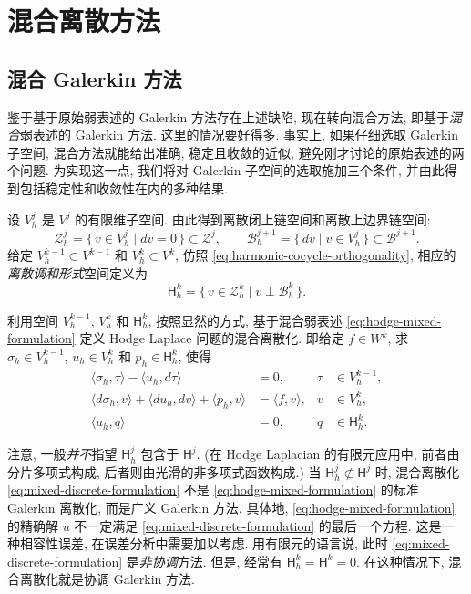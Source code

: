 \section{混合离散方法}\label{sec:mixed-methods}

\subsection{混合 Galerkin 方法}\label{subsec:mixed-galerkin}

鉴于基于原始弱表述的 Galerkin 方法存在上述缺陷, 现在转向混合方法, 即基于\emph{混合}弱表述的 Galerkin 方法. 这里的情况要好得多. 事实上, 如果仔细选取 Galerkin 子空间, 混合方法就能给出准确, 稳定且收敛的近似, 避免刚才讨论的原始表述的两个问题. 为实现这一点, 我们将对 Galerkin 子空间的选取施加三个条件, 并由此得到包括稳定性和收敛性在内的多种结果.

设 $V_h^j$ 是 $V^j$ 的有限维子空间. 由此得到离散闭上链空间和离散上边界链空间:
\[
\mathcal Z_h^j=\{\,v\in V_h^j\mid dv=0\,\}\subset\mathcal Z^j,\qquad\mathcal B_h^{j+1}=\{\,dv\mid v\in V_h^j\,\}\subset\mathcal B^{j+1}.
\]
给定 $V_h^{k-1}\subset V^{k-1}$ 和 $V_h^k\subset V^k$, 仿照 \eqref{eq:harmonic-cocycle-orthogonality}, 相应的\emph{离散调和形式}空间定义为
\[
\mathsf H_h^k=\{\,v\in\mathcal Z_h^k\mid v\perp\mathcal B_h^k\,\}.
\]

利用空间 $V_h^{k-1}$, $V_h^k$ 和 $\mathsf H_h^k$, 按照显然的方式, 基于混合弱表述 \eqref{eq:hodge-mixed-formulation} 定义 Hodge Laplace 问题的混合离散化. 即给定 $f\in W^k$, 求 $\sigma_h\in V_h^{k-1}$, $u_h\in V_h^k$ 和 $p_h\in\mathsf H_h^k$, 使得
\begin{equation}\label{eq:mixed-discrete-formulation}
\begin{aligned}
\langle\sigma_h,\tau\rangle-\langle u_h,d\tau\rangle&=0,&\tau&\in V_h^{k-1},\\
\langle d\sigma_h,v\rangle+\langle du_h,dv\rangle+\langle p_h,v\rangle&=\langle f,v\rangle,&v&\in V_h^k,\\
\langle u_h,q\rangle&=0,&q&\in\mathsf H_h^k.
\end{aligned}
\end{equation}

注意, 一般\emph{并不}指望 $\mathsf H_h^j$ 包含于 $\mathsf H^j$. (在 Hodge Laplacian 的有限元应用中, 前者由分片多项式构成, 后者则由光滑的非多项式函数构成.) 当 $\mathsf H_h^j\not\subset\mathsf H^j$ 时, 混合离散化 \eqref{eq:mixed-discrete-formulation} 不是 \eqref{eq:hodge-mixed-formulation} 的标准 Galerkin 离散化, 而是广义 Galerkin 方法. 具体地, \eqref{eq:hodge-mixed-formulation} 的精确解 $u$ 不一定满足 \eqref{eq:mixed-discrete-formulation} 的最后一个方程. 这是一种相容性误差, 在误差分析中需要加以考虑. 用有限元的语言说, 此时 \eqref{eq:mixed-discrete-formulation} 是\emph{非协调}方法. 但是, 经常有 $\mathsf H_h^k=\mathsf H^k=0$. 在这种情况下, 混合离散化就是协调 Galerkin 方法.

